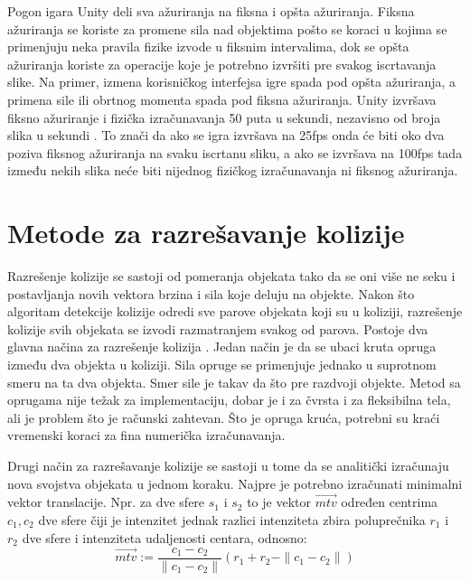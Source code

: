 \documentclass[12pt,oneside]{memoir}
\begin{document}
Pogon igara Unity deli sva ažuriranja na fiksna i opšta ažuriranja. 
Fiksna ažuriranja se koriste za promene sila nad objektima 
pošto se koraci u kojima se primenjuju neka pravila fizike izvode u fiksnim intervalima, 
dok se opšta ažuriranja koriste za operacije koje je potrebno izvršiti pre svakog iscrtavanja slike. 
Na primer, izmena korisničkog interfejsa igre spada pod opšta ažuriranja, a primena sile ili obrtnog momenta spada pod fiksna ažuriranja.
Unity izvršava fiksno ažuriranje i fizička izračunavanja 50 puta u sekundi, nezavisno od broja slika u sekundi \cite{unity}.
To znači da ako se igra izvršava na 25fps onda će biti oko dva poziva fiksnog ažuriranja na svaku iscrtanu sliku,
a ako se izvršava na 100fps tada između nekih slika neće biti nijednog fizičkog izračunavanja ni fiksnog ažuriranja.

\section{Metode za razrešavanje kolizije}
\label{sec:razresenje}

Razrešenje kolizije se sastoji od
pomeranja objekata tako da se oni više ne seku i postavljanja novih vektora brzina i sila koje deluju na objekte.
Nakon što algoritam detekcije kolizije odredi sve parove objekata koji su u koliziji, 
razrešenje kolizije svih objekata se izvodi razmatranjem svakog od parova.
Postoje dva glavna načina za razrešenje kolizija \cite{Moore}.
Jedan način je da se ubaci kruta opruga između dva objekta u koliziji.
Sila opruge se primenjuje jednako u suprotnom smeru na ta dva objekta.
Smer sile je takav da što pre razdvoji objekte. Metod sa oprugama nije težak 
za implementaciju, dobar je i za čvrsta i za fleksibilna tela, ali je problem što je računski zahtevan. 
Što je opruga kruća, potrebni su kraći vremenski koraci za fina numerička izračunavanja.

Drugi način za razrešavanje kolizije se sastoji u tome da se analitički izračunaju nova svojstva objekata u jednom koraku.
Najpre je potrebno izračunati minimalni vektor translacije. Npr. za dve sfere $s_1$ i $s_2$ to je vektor $\overrightarrow{mtv}$
određen centrima $c_1, c_2$ dve sfere čiji je intenzitet jednak razlici intenziteta zbira poluprečnika
$r_1$ i $r_2$ dve sfere i intenziteta udaljenosti centara, odnosno:
\begin{equation}
	\label{eq:mtv}
	 \overrightarrow{mtv} := \frac{{c_1 - c_2}} {\|{c_1 - c_2}\|} 
	(r_1 + r_2 - \| {c_1 - c_2} \| ) 
\end{equation}
\end{document}
